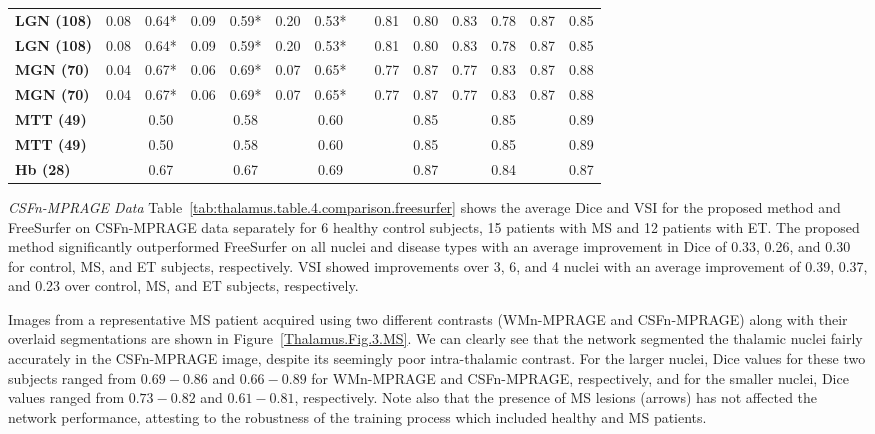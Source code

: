 \begin{table}[t]
{\begin{tabular}{lccccccccccccc}
\rowcolor[HTML]{FFFFFF}
\cellcolor[HTML]{D9D9D9}\textbf{LGN (108)} & 0.08 & 0.64* & 0.09 & 0.59* & 0.20 & 0.53* & & 0.81 & 0.80 & 0.83 & 0.78 & 0.87 & 0.85 \\
\cellcolor[HTML]{D9D9D9}\textbf{LGN (108)} & 0.08 & 0.64* & 0.09 & 0.59* & 0.20 & 0.53* & & 0.81 & 0.80 & 0.83 & 0.78 & 0.87 & 0.85 \\
\rowcolor[HTML]{FFFFFF}
\cellcolor[HTML]{D9D9D9}\textbf{MGN (70)} & 0.04 & 0.67* & 0.06 & 0.69* & 0.07 & 0.65* & & 0.77 & 0.87 & 0.77 & 0.83 & 0.87 & 0.88 \\
\cellcolor[HTML]{D9D9D9}\textbf{MGN (70)} & 0.04 & 0.67* & 0.06 & 0.69* & 0.07 & 0.65* & & 0.77 & 0.87 & 0.77 & 0.83 & 0.87 & 0.88 \\
\rowcolor[HTML]{FFFFFF}
\cellcolor[HTML]{D9D9D9}\textbf{MTT (49)} & & 0.50 & & 0.58 & & 0.60 & & & 0.85 & & 0.85 & & 0.89 \\
\cellcolor[HTML]{D9D9D9}\textbf{MTT (49)} & & 0.50 & & 0.58 & & 0.60 & & & 0.85 & & 0.85 & & 0.89 \\
\rowcolor[HTML]{FFFFFF}
\cellcolor[HTML]{D9D9D9}\textbf{Hb (28)} & & 0.67 & & 0.67 & & 0.69 & & & 0.87 & & 0.84 & & 0.87
\end{tabular}
}
\end{table}

\emph{CSFn-MPRAGE Data}
Table~\ref{tab:thalamus.table.4.comparison.freesurfer}  shows the average Dice and VSI for the proposed method and FreeSurfer on CSFn-MPRAGE data separately for 6 healthy control subjects, 15 patients with MS and 12 patients with ET\@. The proposed method significantly outperformed FreeSurfer on all nuclei and disease types with an average improvement in Dice of 0.33, 0.26, and 0.30 for control, MS, and ET subjects, respectively. VSI showed improvements over 3, 6, and 4 nuclei with an average improvement of 0.39, 0.37, and 0.23 over control, MS, and ET subjects, respectively.


Images from a representative MS patient acquired using two different contrasts (WMn-MPRAGE and CSFn-MPRAGE) along with their overlaid segmentations are shown in Figure~\ref{Thalamus.Fig.3.MS}. We can clearly see that the network segmented the thalamic nuclei fairly accurately in the CSFn-MPRAGE image, despite its seemingly poor intra-thalamic contrast. For the larger nuclei, Dice values for these two subjects ranged from $0.69-0.86$ and $0.66-0.89$ for WMn-MPRAGE and CSFn-MPRAGE, respectively, and for the smaller nuclei, Dice values ranged from $0.73-0.82$ and $0.61-0.81$, respectively. Note also that the presence of MS lesions (arrows) has not affected the network performance, attesting to the robustness of the training process which included healthy and MS patients.

